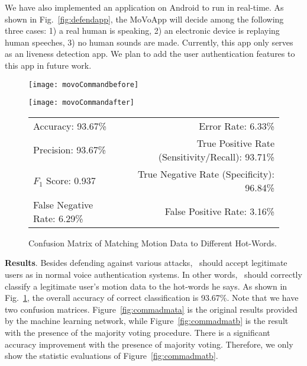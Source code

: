 We have also implemented an application on Android to run {\uu} in real-time. As shown in Fig.~\ref{fig:defendapp}, the MoVoApp will decide among the following three cases: 1) a real human is speaking, 2) an electronic device is replaying human speeches, 3) no human sounds are made. Currently, this app only serves as an liveness detection app. We plan to add the user authentication features to this app in future work. 
\begin{figure}[H]
	\centering
	\begin{minipage}{.35\linewidth}
		\texttt{[image: movoCommandbefore]}
		\label{fig:commadmata}
		\vspace{.05in}
	\end{minipage}
	\begin{minipage}{.35\linewidth}
		\texttt{[image: movoCommandafter]}
		\label{fig:commadmatb}
		\vspace{.05in}
	\end{minipage}
	
	\centering
	\begin{tabular}{lr}
		\toprule
		Accuracy: 93.67\% & \hspace{-.55in} Error Rate: 6.33\% \\
		Precision: 93.67\% & \hspace{-.55in} True Positive Rate (Sensitivity/Recall): 93.71\% \\
		$F_1$ Score: 0.937 & \hspace{-.55in} True Negative Rate (Specificity): 96.84\% \\
		False Negative Rate: 6.29\% & \hspace{-.55in} False Positive Rate: 3.16\% \\
		\bottomrule
	\end{tabular}
	\caption{Confusion Matrix of Matching Motion Data to Different Hot-Words. }
	\label{fig:commadmat}
\end{figure}


\textbf{Results}.
%
Besides defending against various attacks, \shortname~should accept legitimate users as in normal voice authentication systems. In other words, \shortname~should correctly classify a legitimate user's motion data to the hot-words he says. As shown in Fig.~\ref{fig:commadmat}, the overall accuracy of correct classification is 93.67\%. 
Note that we have two confusion matrices. Figure~\ref{fig:commadmata} is the original results provided by the machine learning network, while Figure~\ref{fig:commadmatb} is the result with the presence of the majority voting procedure. There is a significant accuracy improvement with the presence of majority voting. Therefore, we only show the statistic evaluations of Figure~\ref{fig:commadmatb}. 


